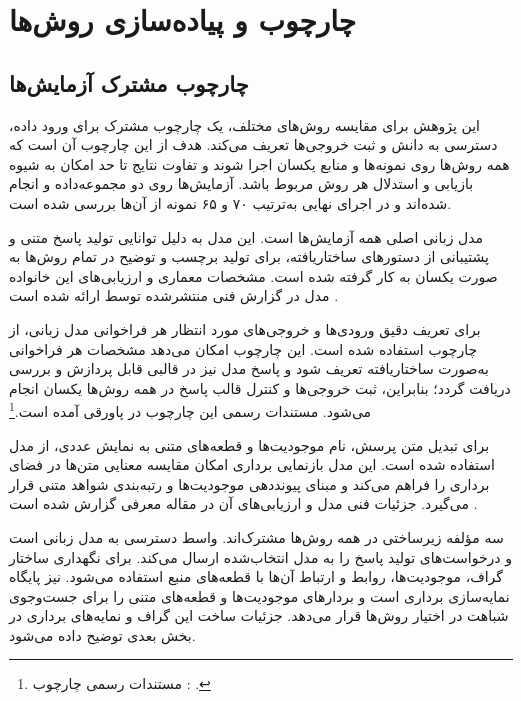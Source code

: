 \chapter{چارچوب و پیاده‌سازی روش‌ها}

\section{چارچوب مشترک آزمایش‌ها}

این پژوهش برای مقایسه روش‌های مختلف، یک چارچوب مشترک برای ورود داده، دسترسی به دانش و ثبت خروجی‌ها تعریف می‌کند. هدف از این چارچوب آن است که همه روش‌ها روی نمونه‌ها و منابع یکسان اجرا شوند و تفاوت نتایج تا حد امکان به شیوه بازیابی و استدلال هر روش مربوط باشد. آزمایش‌ها روی دو مجموعه‌داده  و  انجام شده‌اند و در اجرای نهایی به‌ترتیب ۷۰ و ۶۵ نمونه از آن‌ها بررسی شده است.

مدل زبانی اصلی همه آزمایش‌ها  است. این مدل به دلیل توانایی تولید پاسخ متنی و پشتیبانی از دستورهای ساختاریافته، برای تولید برچسب و توضیح در تمام روش‌ها به صورت یکسان به کار گرفته شده است. مشخصات معماری و ارزیابی‌های این خانواده مدل در گزارش فنی منتشرشده توسط  ارائه شده است \cite{gemma4technicalreport}.

برای تعریف دقیق ورودی‌ها و خروجی‌های مورد انتظار هر فراخوانی مدل زبانی، از چارچوب  استفاده شده است. این چارچوب امکان می‌دهد مشخصات هر فراخوانی به‌صورت ساختاریافته تعریف شود و پاسخ مدل نیز در قالبی قابل پردازش و بررسی دریافت گردد؛ بنابراین، ثبت خروجی‌ها و کنترل قالب پاسخ در همه روش‌ها یکسان انجام می‌شود. مستندات رسمی این چارچوب در پاورقی آمده است.\footnote{مستندات رسمی چارچوب : .}

برای تبدیل متن پرسش، نام موجودیت‌ها و قطعه‌های متنی به نمایش عددی، از مدل  استفاده شده است. این مدل بازنمایی برداری امکان مقایسه معنایی متن‌ها در فضای برداری را فراهم می‌کند و مبنای پیونددهی موجودیت‌ها و رتبه‌بندی شواهد متنی قرار می‌گیرد. جزئیات فنی مدل و ارزیابی‌های آن در مقاله معرفی  گزارش شده است \cite{gunther2025jinaembeddingsv4}.

سه مؤلفه زیرساختی در همه روش‌ها مشترک‌اند.  واسط دسترسی به مدل زبانی است و درخواست‌های تولید پاسخ را به مدل انتخاب‌شده ارسال می‌کند.  برای نگهداری ساختار گراف، موجودیت‌ها، روابط و ارتباط آن‌ها با قطعه‌های منبع استفاده می‌شود.  نیز پایگاه نمایه‌سازی برداری است و بردارهای موجودیت‌ها و قطعه‌های متنی را برای جست‌وجوی شباهت در اختیار روش‌ها قرار می‌دهد. جزئیات ساخت این گراف و نمایه‌های برداری در بخش بعدی توضیح داده می‌شود.

